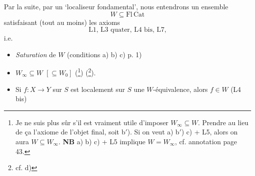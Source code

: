 \documentclass[11pt]{article}
\newcommand{\msp}[1]{\marginpar{\footnotesize [#1]}}
\begin{document}
\msp{page 45}
Par la suite, par un ‘localiseur fondamental’, nous entendrons un ensemble
\[
W \subseteq \mathrm{Fl}\,\mathrm{Cat}
\]
satisfaisant (tout au moins) les axioms %
\[
\text{L1, L3 quater, L4 bis, L7,}
\]
i.e.

\begin{itemize}
\item[a)] \textit{Saturation} de $W$ (conditions a) b) c) p. 1)

\item[b)] $W_\infty \subseteq W$ $[\subseteq W_0]$ (\footnote[30]{Je ne suis plus sûr s'il est vraiment utile d'imposer $W_\infty \subseteq W$. Prendre au lieu de ça l'axiome de l'objet final, soit b$'$). Si on veut a) b$'$) c) + L5, alors on aura $W \subseteq W_\infty$. \textbf{NB} a) b) c) + L5 implique $W = W_\infty$, cf. annotation page 43.}) (\footnote[31]{cf. d)}).

\item[c)] Si $f : X \longrightarrow Y$ sur $S$ est localement sur $S$ une $W$-équivalence, alors $f \in W$ (L4 bis)
\end{itemize}
\end{document}
